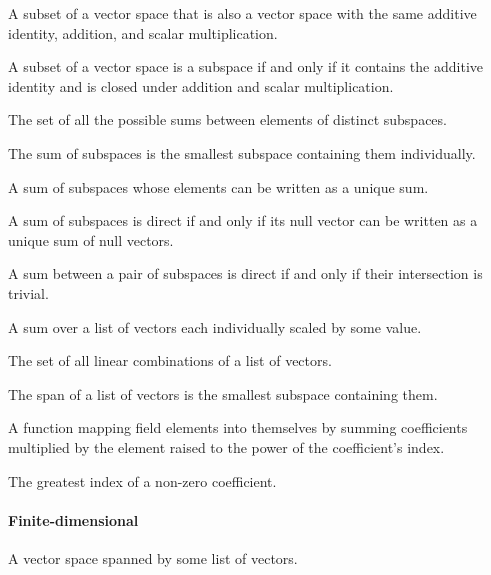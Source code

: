 \pagebreak


\begin{multicols}{3}

  A subset of a vector space that is also a vector space with the same additive identity, addition, and scalar multiplication.

  A subset of a vector space is a subspace if and only if it contains the additive identity and is closed under addition and scalar multiplication.

  The set of all the possible sums between elements of distinct subspaces.
  
  The sum of subspaces is the smallest subspace containing them individually.
  
  A sum of subspaces whose elements can be written as a unique sum.
  
  A sum of subspaces is direct if and only if its null vector can be written as a unique sum of null vectors.

  A sum between a pair of subspaces is direct if and only if their intersection is trivial.

  A sum over a list of vectors each individually scaled by some value.
  
  The set of all linear combinations of a list of vectors.
  
  The span of a list of vectors is the smallest subspace containing them.

  A function mapping field elements into themselves by summing coefficients multiplied by the element raised to the power of the coefficient's index.
  
  The greatest index of a non-zero coefficient.
  
  \paragraph{\textbf{Finite-dimensional}}
  A vector space spanned by some list of vectors.

\end{multicols}
